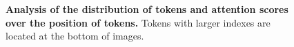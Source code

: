     
\begin{figure}[!ht]
    \vspace{-3mm}
    \centering
    \vspace{-4mm}
    \caption{\textbf{Analysis of the distribution of tokens and attention scores over the position of tokens.} Tokens with larger indexes are located at the bottom of images.}
    \vspace{-4mm}
    \label{fig:position_bias}
\end{figure}
